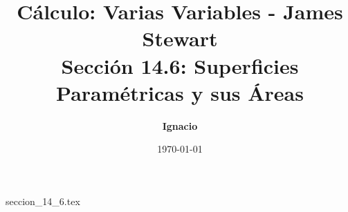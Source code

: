 \documentclass[11pt,spanish,oneside]{report}
\title{\textbf{Cálculo: Varias Variables - James Stewart} \\ \Large Sección 14.6: Superficies Paramétricas y sus Áreas}
\author{\textbf{Ignacio}}
\date{\today}
\begin{document}
\maketitle

{seccion_14_6.tex}
\end{document}
